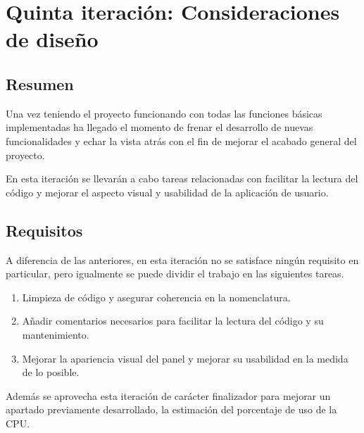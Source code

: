 
\section{Quinta iteración: Consideraciones de diseño}
    \subsection{Resumen}
    
        Una vez teniendo el proyecto funcionando con todas las funciones básicas implementadas ha llegado el momento de frenar el desarrollo de nuevas funcionalidades y echar la vista atrás con el fin de mejorar el acabado general del proyecto.
        
        En esta iteración se llevarán a cabo tareas relacionadas con facilitar la lectura del código y mejorar el aspecto visual y usabilidad de la aplicación de usuario.
    
    \subsection{Requisitos}
    
        A diferencia de las anteriores, en esta iteración no se satisface ningún requisito en particular, pero igualmente se puede dividir el trabajo en las siguientes tareas.
        
        \begin{enumerate}
            \item Limpieza de código y asegurar coherencia en la nomenclatura.
            \item Añadir comentarios necesarios para facilitar la lectura del código y su mantenimiento.
            \item Mejorar la apariencia visual del panel y mejorar su usabilidad en la medida de lo posible.
        \end{enumerate}
        
        Además se aprovecha esta iteración de carácter finalizador para mejorar un apartado previamente desarrollado, la estimación del porcentaje de uso de la CPU.
